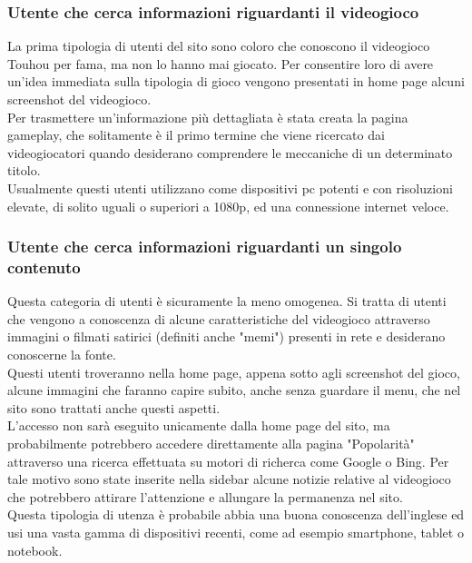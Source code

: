 \documentclass[openany, a4paper, 12pt]{report}
\begin{document}
		\subsubsection{Utente che cerca informazioni riguardanti il videogioco}
		La prima tipologia di utenti del sito sono coloro che conoscono il videogioco Touhou per fama, ma non lo hanno mai giocato. Per consentire loro di avere un'idea immediata sulla tipologia di gioco vengono presentati in home page alcuni screenshot del videogioco.\\
		Per trasmettere un'informazione più dettagliata è stata creata la pagina gameplay, che solitamente è il primo termine che viene ricercato dai videogiocatori quando desiderano comprendere le meccaniche di un determinato titolo.\\
		Usualmente questi utenti utilizzano come dispositivi pc potenti e con risoluzioni elevate, di solito uguali o superiori a 1080p, ed una connessione internet veloce.
		\subsubsection{Utente che cerca informazioni riguardanti un singolo contenuto}
		Questa categoria di utenti è sicuramente la meno omogenea. Si tratta di utenti che vengono a conoscenza di alcune caratteristiche del videogioco attraverso immagini o filmati satirici (definiti anche "memi") presenti in rete e desiderano conoscerne la fonte.\\
		Questi utenti troveranno nella home page, appena sotto agli screenshot del gioco, alcune immagini che faranno capire subito, anche senza guardare il menu, che nel sito sono trattati anche questi aspetti.\\
		L'accesso non sarà eseguito unicamente dalla home page del sito, ma probabilmente potrebbero accedere direttamente alla pagina "Popolarità" attraverso una ricerca effettuata su motori di richerca come Google o Bing. Per tale motivo sono state inserite nella sidebar alcune notizie relative al videogioco che potrebbero attirare l'attenzione e allungare la permanenza nel sito.\\
		Questa tipologia di utenza è probabile abbia una buona conoscenza dell'inglese ed usi una vasta gamma di dispositivi recenti, come ad esempio smartphone, tablet o notebook.\\
\end{document}
